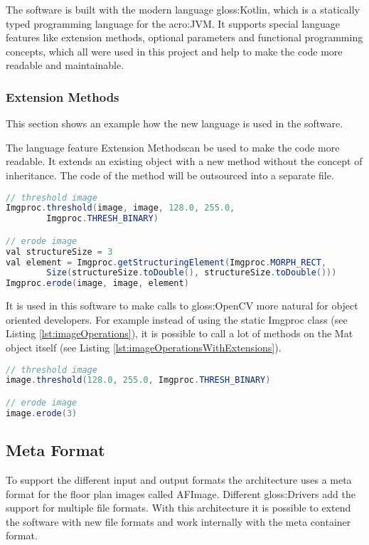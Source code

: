 The software is built with the modern language \gls{gloss:Kotlin}, which is a statically typed programming language for the \acrfull{acro:JVM}. It supports special language features like extension methods, optional parameters and functional programming concepts, which all were used in this project and help to make the code more readable and maintainable. \cite{kotlin}

\subsubsection{Extension Methods}
This section shows an example how the new language is used in the software.

The language feature \flqq Extension Methods\frqq  can be used to make the code more readable. It extends an existing object with a new method without the concept of inheritance. The code of the method will be outsourced into a separate file.

\begin{lstlisting}[caption={Erode image without extension methods},label={lst:imageOperations},language=Java]
// threshold image
Imgproc.threshold(image, image, 128.0, 255.0, 
		Imgproc.THRESH_BINARY)

// erode image
val structureSize = 3
val element = Imgproc.getStructuringElement(Imgproc.MORPH_RECT, 
        Size(structureSize.toDouble(), structureSize.toDouble()))
Imgproc.erode(image, image, element)
\end{lstlisting}

It is used in this software to make calls to \gls{gloss:OpenCV} more natural for object oriented developers. For example instead of using the static Imgproc class (see Listing \ref{lst:imageOperations}), it is possible to call a lot of methods on the Mat object itself (see Listing \ref{lst:imageOperationsWithExtensions}).

\begin{lstlisting}[caption={Erode image with extension methods},label={lst:imageOperationsWithExtensions},language=Java]
// threshold image
image.threshold(128.0, 255.0, Imgproc.THRESH_BINARY)

// erode image
image.erode(3)
\end{lstlisting}

\pagebreak

\subsection{Meta Format}
To support the different input and output formats the architecture uses a meta format for the
floor plan images called AFImage. Different \gls{gloss:Drivers}  add the support for multiple file formats. With this architecture it is possible to extend the software with new file formats and work internally with the meta container format.

